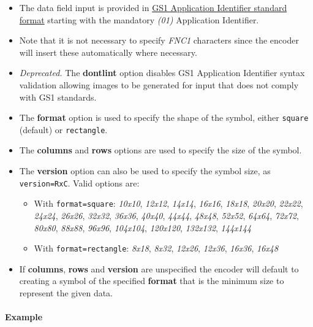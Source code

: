 \begin{itemize}
\tightlist
\item
  The data field input is provided in
  \protect\hyperlink{gs1-application-identifier-standard-format}{GS1
  Application Identifier standard format} starting with the mandatory
  \emph{(01)} Application Identifier.
\item
  Note that it is not necessary to specify \emph{FNC1} characters since
  the encoder will insert these automatically where necessary.
\item
  \emph{Deprecated.} The \textbf{dontlint} option disables GS1
  Application Identifier syntax validation allowing images to be
  generated for input that does not comply with GS1 standards.
\item
  The \textbf{format} option is used to specify the shape of the symbol,
  either \texttt{square} (default) or \texttt{rectangle}.
\item
  The \textbf{columns} and \textbf{rows} options are used to specify the
  size of the symbol.
\item
  The \textbf{version} option can also be used to specify the symbol
  size, as \texttt{version=RxC}. Valid options are:

  \begin{itemize}
  \tightlist
  \item
    With \texttt{format=square}: \emph{10x10}, \emph{12x12},
    \emph{14x14}, \emph{16x16}, \emph{18x18}, \emph{20x20},
    \emph{22x22}, \emph{24x24}, \emph{26x26}, \emph{32x32},
    \emph{36x36}, \emph{40x40}, \emph{44x44}, \emph{48x48},
    \emph{52x52}, \emph{64x64}, \emph{72x72}, \emph{80x80},
    \emph{88x88}, \emph{96x96}, \emph{104x104}, \emph{120x120},
    \emph{132x132}, \emph{144x144}
  \item
    With \texttt{format=rectangle}: \emph{8x18}, \emph{8x32},
    \emph{12x26}, \emph{12x36}, \emph{16x36}, \emph{16x48}
  \end{itemize}
\item
  If \textbf{columns}, \textbf{rows} and \textbf{version} are
  unspecified the encoder will default to creating a symbol of the
  specified \textbf{format} that is the minimum size to represent the
  given data.
\end{itemize}

\hypertarget{example-4}{%
\paragraph{Example}\label{example-4}}

